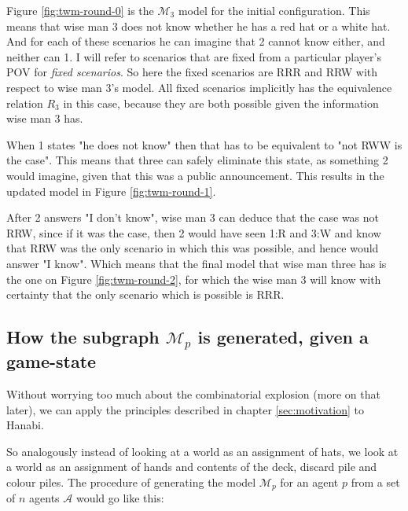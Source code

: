 Figure \ref{fig:twm-round-0} is the $\mathcal{M}_{3}$ model for the initial configuration. 
This means that wise man 3 does not know whether he has a red hat or a white hat. 
And for each of these scenarios he can imagine that 2 cannot know either, and neither can 1. 
I will refer to scenarios that are fixed from a particular player's POV for \emph{fixed scenarios}. 
So here the fixed scenarios are RRR and RRW with respect to wise man 3's model. 
All fixed scenarios implicitly has the equivalence relation $R_3$ in this case, because they are both possible given the information wise man 3 has.

When 1 states "he does not know" then that has to be equivalent to "not RWW is the case". 
This means that three can safely eliminate this state, as something 2 would imagine, given that this was a public announcement. 
This results in the updated model in Figure \ref{fig:twm-round-1}.

After 2 answers "I don't know", wise man 3 can deduce that the case was not RRW, since if it was the case, then 2 would have seen 1:R and 3:W and know that RRW was the only scenario in which this was possible, and hence would answer "I know". 
Which means that the final model that wise man three has is the one on Figure \ref{fig:twm-round-2}, for which the wise man 3 will know with certainty that the only scenario which is possible is RRR.



\subsection{How the subgraph $\mathcal{M}_p$ is generated, given a game-state} \label{sec:description-of-how-modal-logic-is_applied}
Without worrying too much about the combinatorial explosion (more on that later), we can apply the principles described in chapter \ref{sec:motivation} to Hanabi. 

So analogously instead of looking at a world as an assignment of hats, we look at a world as an assignment of hands and contents of the deck, discard pile and colour piles. 
The procedure of generating the model $\mathcal{M}_p$ for an agent $p$ from a set of $n$ agents $\mathcal{A}$ would go like this:

